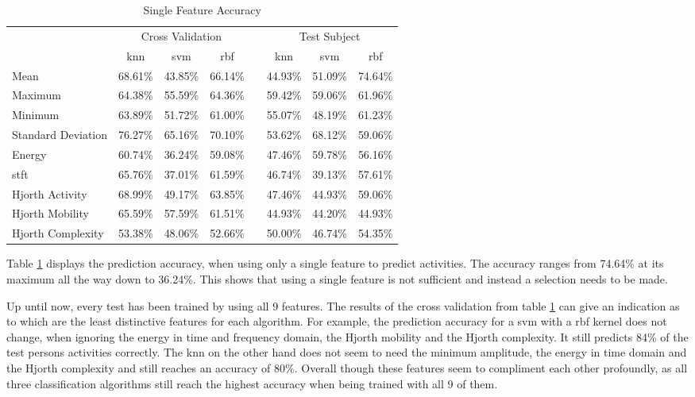 \begin{table}
    \centering
    \begin{tabular}{lccccccc}
        \toprule
         & \multicolumn{3}{c}{Cross Validation} &  & \multicolumn{3}{c}{Test Subject} \\
        \cline{2-4} \cline{6-8} & \gls{knn} & \gls{svm} & \gls{rbf} &  & \gls{knn} & \gls{svm} & \gls{rbf} \\
        \midrule
        Mean               & 68.61\% & 43.85\% & 66.14\% &  & 44.93\% & 51.09\% & 74.64\% \\
        Maximum            & 64.38\% & 55.59\% & 64.36\% &  & 59.42\% & 59.06\% & 61.96\% \\
        Minimum            & 63.89\% & 51.72\% & 61.00\% &  & 55.07\% & 48.19\% & 61.23\% \\
        Standard Deviation & 76.27\% & 65.16\% & 70.10\% &  & 53.62\% & 68.12\% & 59.06\% \\
        Energy             & 60.74\% & 36.24\% & 59.08\% &  & 47.46\% & 59.78\% & 56.16\% \\
        \gls{stft}         & 65.76\% & 37.01\% & 61.59\% &  & 46.74\% & 39.13\% & 57.61\% \\
        Hjorth Activity    & 68.99\% & 49.17\% & 63.85\% &  & 47.46\% & 44.93\% & 59.06\% \\
        Hjorth Mobility    & 65.59\% & 57.59\% & 61.51\% &  & 44.93\% & 44.20\% & 44.93\% \\
        Hjorth Complexity  & 53.38\% & 48.06\% & 52.66\% &  & 50.00\% & 46.74\% & 54.35\% \\
        \bottomrule
    \end{tabular}
    \caption{Single Feature Accuracy}
    \label{table:features}
\end{table}

Table \ref{table:features} displays the prediction accuracy, when using only a single feature to predict activities. The accuracy ranges from 74.64\% at its maximum all the way down to 36.24\%. This shows that using a single feature is not sufficient and instead a selection needs to be made.

Up until now, every test has been trained by using all 9 features. The results of the cross validation from table \ref{table:features} can give an indication as to which are the least distinctive features for each algorithm. For example, the prediction accuracy for a \gls{svm} with a \gls{rbf} kernel does not change, when ignoring the energy in time and frequency domain, the Hjorth mobility and the Hjorth complexity. It still predicts 84\% of the test persons activities correctly. The \gls{knn} on the other hand does not seem to need the minimum amplitude, the energy in time domain and the Hjorth complexity and still reaches an accuracy of 80\%. Overall though these features seem to compliment each other profoundly, as all three classification algorithms still reach the highest accuracy when being trained with all 9 of them.

